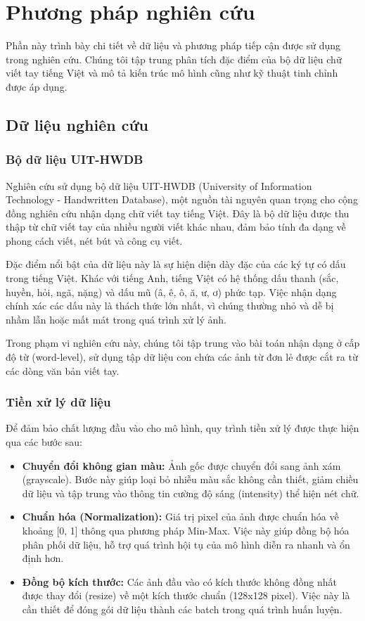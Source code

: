 \section{Phương pháp nghiên cứu}

Phần này trình bày chi tiết về dữ liệu và phương pháp tiếp cận được sử dụng trong nghiên cứu. Chúng tôi tập trung phân tích đặc điểm của bộ dữ liệu chữ viết tay tiếng Việt và mô tả kiến trúc mô hình cũng như kỹ thuật tinh chỉnh được áp dụng.

\subsection{Dữ liệu nghiên cứu}

\subsubsection{Bộ dữ liệu UIT-HWDB}
Nghiên cứu sử dụng bộ dữ liệu UIT-HWDB \cite{DBLP:conf/rivf/NguyenVN22} (University of Information Technology - Handwritten Database), một nguồn tài nguyên quan trọng cho cộng đồng nghiên cứu nhận dạng chữ viết tay tiếng Việt. Đây là bộ dữ liệu được thu thập từ chữ viết tay của nhiều người viết khác nhau, đảm bảo tính đa dạng về phong cách viết, nét bút và công cụ viết.

Đặc điểm nổi bật của dữ liệu này là sự hiện diện dày đặc của các ký tự có dấu trong tiếng Việt. Khác với tiếng Anh, tiếng Việt có hệ thống dấu thanh (sắc, huyền, hỏi, ngã, nặng) và dấu mũ (â, ê, ô, ă, ư, ơ) phức tạp. Việc nhận dạng chính xác các dấu này là thách thức lớn nhất, vì chúng thường nhỏ và dễ bị nhầm lẫn hoặc mất mát trong quá trình xử lý ảnh.

Trong phạm vi nghiên cứu này, chúng tôi tập trung vào bài toán nhận dạng ở cấp độ từ (word-level), sử dụng tập dữ liệu con chứa các ảnh từ đơn lẻ được cắt ra từ các dòng văn bản viết tay.

\subsubsection{Tiền xử lý dữ liệu}
Để đảm bảo chất lượng đầu vào cho mô hình, quy trình tiền xử lý được thực hiện qua các bước sau:

\begin{itemize}
    \item \textbf{Chuyển đổi không gian màu:} Ảnh gốc được chuyển đổi sang ảnh xám (grayscale). Bước này giúp loại bỏ nhiễu màu sắc không cần thiết, giảm chiều dữ liệu và tập trung vào thông tin cường độ sáng (intensity) thể hiện nét chữ.
    \item \textbf{Chuẩn hóa (Normalization):} Giá trị pixel của ảnh được chuẩn hóa về khoảng [0, 1] thông qua phương pháp Min-Max. Việc này giúp đồng bộ hóa phân phối dữ liệu, hỗ trợ quá trình hội tụ của mô hình diễn ra nhanh và ổn định hơn.
    \item \textbf{Đồng bộ kích thước:} Các ảnh đầu vào có kích thước không đồng nhất được thay đổi (resize) về một kích thước chuẩn (128x128 pixel). Việc này là cần thiết để đóng gói dữ liệu thành các batch trong quá trình huấn luyện.
\end{itemize}


